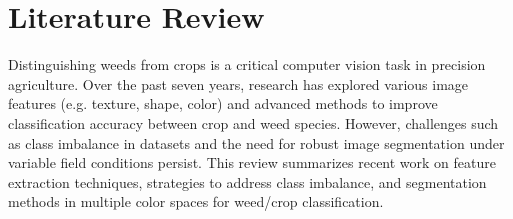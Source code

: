 \documentclass[letterpaper]{report}
\begin{document}
%
%
%
%
%


\chapter{Literature Review}
\label{section:literature}
 
Distinguishing weeds from crops is a critical computer vision task in precision agriculture. Over the past seven years, research has explored various image features (e.g. texture, shape, color) and advanced methods to improve classification accuracy between crop and weed species. However, challenges such as class imbalance in datasets and the need for robust image segmentation under variable field conditions persist. This review summarizes recent work on feature extraction techniques, strategies to address class imbalance, and segmentation methods in multiple color spaces for weed/crop classification.
\end{document}
